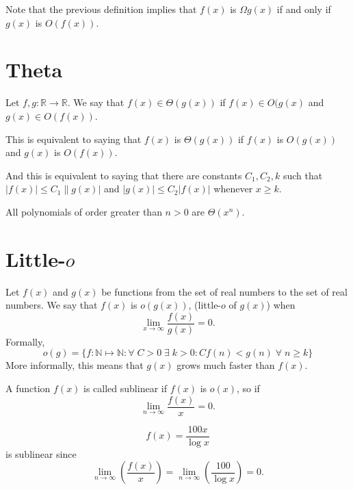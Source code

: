 \begin{remark}
    Note that the previous definition implies that $f(x)$ is $\Omega g(x)$ if and only if $g(x)$ is $O(f(x))$.
\end{remark}

\section{Theta}

\begin{definition}[$\Theta$]
    Let $f, g : \mathbb R \to \mathbb R$. We say that $f(x) \in \Theta(g(x))$ if $f(x) \in O(g(x)$ and $g(x) \in O(f(x))$.
\end{definition}

This is equivalent to saying that $f(x)$ is $\Theta(g(x))$ if $f(x)$ is $O(g(x))$ and $g(x)$ is $O(f(x))$.

And this is equivalent to saying that there are constants $C_1,C_2,k$ such that $|f(x)|\leq C_1\|g(x)|$ and $|g(x)|\leq C_2|f(x)|$ whenever $x\geq k$.

\begin{example}
    All polynomials of order greater than $n>0$ are $\Theta(x^n)$.
\end{example}

\section{Little-$o$}



\begin{definition}[Little-$o$]
    Let $f(x)$ and $g(x)$ be functions from the set of real numbers to the set of real numbers. We say that $f(x)$ is $o(g(x))$, (little-$o$ of $g(x)$) when \[\lim_{x\to\infty}\dfrac{f(x)}{g(x)}=0.\]
    Formally,
    \[o(g)=\{f:\mathbb N\mapsto\mathbb N:\forall\; C>0\;\exists\;k>0:Cf(n)<g(n)\;\forall\;n\geq k\}\]
    More informally, this means that $g(x)$ grows much faster than $f(x)$.
\end{definition}


\begin{definition}
    A function $f(x)$ is called sublinear if $f(x)$ is $o(x)$, so if \[\lim_{n\to\infty}\dfrac{f(x)}{x}=0.\]
\end{definition}

\begin{example}
    \[f(x)=\dfrac{100x}{\log{x}}\] is sublinear since \[\lim_{n\to\infty}\left(\dfrac{f(x)}{x}\right)=\lim_{n\to\infty}\left(\dfrac{100}{\log{x}}\right)=0.\]
\end{example}

